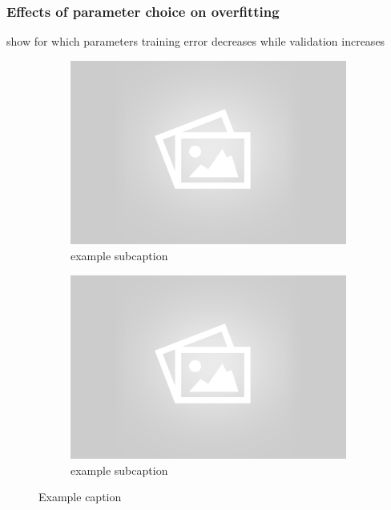 \subsubsection{Effects of parameter choice on overfitting}
show for which parameters training error decreases while validation increases
	\begin{figure}[!ht]
	\centering
	\begin{subfigure}[b]{.45\textwidth}
	\centering
	\includegraphics[width=\textwidth]{mlp/placeholder.png}
	\caption{example subcaption}
	\end{subfigure}
	\quad
	\begin{subfigure}[b]{.45\textwidth}
	\centering
	\includegraphics[width=\textwidth]{mlp/placeholder.png}
	\caption{example subcaption}
	\end{subfigure}
	\caption{Example caption}
	\label{fig:overfiting}
	\end{figure}

